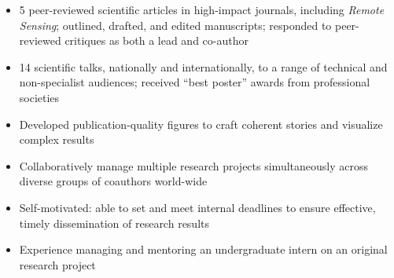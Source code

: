 \documentclass[10pt,a4paper,ragged2e,withhyper]{altacv}
\begin{document}
\begin{paracol}{2}
  \begin{itemize}
    \item 5 peer-reviewed scientific articles in high-impact journals, including \textit{Remote Sensing}; outlined, drafted,
    and edited manuscripts; responded to peer-reviewed critiques as both a lead and co-author
    \item 14 scientific talks, nationally and internationally, to a range of technical and non-specialist audiences; received ``best poster'' awards from professional societies
    \item Developed publication-quality figures to craft coherent stories and visualize complex results
  \end{itemize}

  \vspace{-0.5em}
  \divider

  \begin{itemize}
    \item Collaboratively manage multiple research projects simultaneously across diverse groups of coauthors world-wide
    \item Self-motivated: able to set and meet internal deadlines to ensure effective, timely dissemination of research results
    \item Experience managing and mentoring an undergraduate intern on an original research project
  \end{itemize}








\end{paracol}
\end{document}
